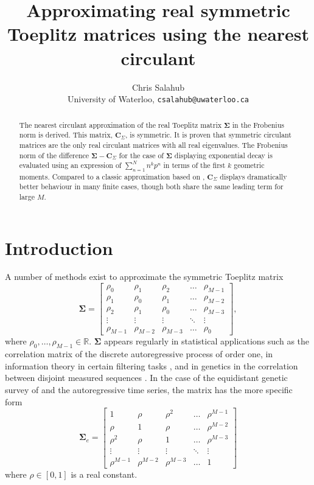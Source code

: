 \documentclass[letterpaper,12pt,oneside,final]{article}
\title{Approximating real symmetric Toeplitz matrices using the nearest circulant}
\author{Chris Salahub \\ {\footnotesize University of Waterloo, \texttt{csalahub@uwaterloo.ca}}}
\newcommand{\m}[1]{\mathbf{#1}}               %
\newcommand{\sm}[1]{\boldsymbol{#1}}   %
\newcommand{\field}[1]{\mathbb{#1}}
\newcommand{\Reals}{\field{R}}
\begin{document}
\maketitle

\begin{abstract}
  The nearest circulant approximation of the real Toeplitz matrix $\sm{\Sigma}$ in the Frobenius norm is derived. This matrix, $\m{C}_{\Sigma}$, is symmetric. It is proven that symmetric circulant matrices are the only real circulant matrices with all real eigenvalues. The Frobenius norm of the difference $\sm{\Sigma} - \m{C}_{\Sigma}$ for the case of $\sm{\Sigma}$ displaying exponential decay is evaluated using an expression of $\sum_{n=1}^{N} n^k p^n$ in terms of the first $k$ geometric moments. Compared to a classic approximation based on \cite{grenanderszego1958}, $\m{C}_{\Sigma}$ displays dramatically better behaviour in many finite cases, though both share the same leading term for large $M$.
\end{abstract}

\section{Introduction}

A number of methods exist to approximate the symmetric Toeplitz matrix
\begin{equation} \label{eq:multipleTesting:genEigCov}
  \sm{\Sigma} = \begin{bmatrix}
    \rho_0 & \rho_1 & \rho_2 & \dots & \rho_{M-1} \\
    \rho_1 & \rho_0 & \rho_1 & \dots & \rho_{M-2} \\
    \rho_2 & \rho_1 & \rho_0 & \dots & \rho_{M-3} \\
    \vdots & \vdots & \vdots & \ddots & \vdots \\
    \rho_{M-1} & \rho_{M-2} & \rho_{M-3} & \dots & \rho_0
  \end{bmatrix},
\end{equation}
where $\rho_0, \dots, \rho_{M-1} \in \Reals$. $\sm{\Sigma}$ appears regularly in statistical applications such as the correlation matrix of the discrete autoregressive process of order one, in information theory in certain filtering tasks \cite{gray2006toeplitz}, and in genetics in the correlation between disjoint measured sequences \cite{salahub2022correlation}. In the case of the equidistant genetic survey of \cite{LanderBotstein1989} and the autoregressive time series, the matrix has the more specific form
\begin{equation} \label{eq:multipleTesting:specEigCov}
  \sm{\Sigma}_e = \begin{bmatrix}
    1 & \rho & \rho^2 & \dots & \rho^{M-1} \\
    \rho & 1 & \rho & \dots & \rho^{M-2} \\
    \rho^2 & \rho & 1 & \dots & \rho^{M-3} \\
    \vdots & \vdots & \vdots & \ddots & \vdots \\
    \rho^{M-1} & \rho^{M-2} & \rho^{M-3} & \dots & 1
  \end{bmatrix}
\end{equation}
where $\rho \in [0, 1]$ is a real constant.
\end{document}
